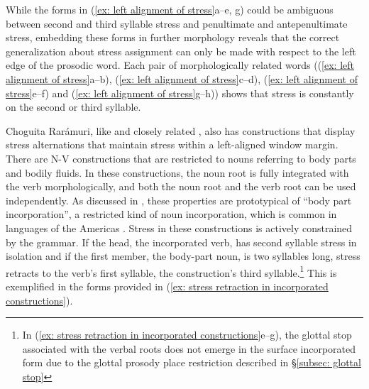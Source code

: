     \z
\z

While the forms in (\ref{ex: left alignment of stress}a--e, g) could be ambiguous between second and third syllable stress and penultimate and antepenultimate stress, embedding these forms in further morphology reveals that the correct generalization about stress assignment can only be made with respect to the left edge of the prosodic word. Each pair of morphologically related words ((\ref{ex: left alignment of stress}a--b), (\ref{ex: left alignment of stress}c--d), (\ref{ex: left alignment of stress}e--f) and (\ref{ex: left alignment of stress}g--h)) shows that stress is constantly on the second or third syllable.

Choguita Rarámuri, like  and closely related , also has constructions that display stress alternations that maintain stress within a left-aligned window margin. There are N-V constructions that are restricted to nouns referring to body parts and bodily fluids. In these constructions, the noun root is fully integrated with the verb morphologically, and both the noun root and the verb root can be used independently. As discussed in , these properties are prototypical of ``body part incorporation'', a restricted kind of noun incorporation, which is common in languages of the Americas \parencite{baker1996polysynthesis}. Stress in these constructions is actively constrained by the grammar. If the head, the incorporated verb, has second syllable stress in isolation and if the first member, the body-part noun, is two syllables long, stress retracts to the verb’s first syllable, the construction’s third syllable.\footnote{In (\ref{ex: stress retraction in incorporated constructions}e--g), the glottal stop associated with the verbal roots does not emerge in the surface incorporated form due to the glottal prosody place restriction described in §\ref{subsec: glottal stop}} This is exemplified in the forms provided in (\ref{ex: stress retraction in incorporated constructions}).

